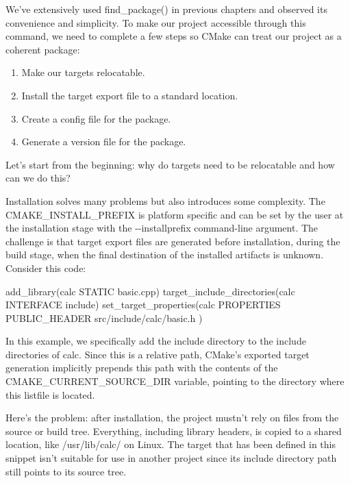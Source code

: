 
We’ve extensively used find\_package() in previous chapters and observed its convenience and simplicity. To make our project accessible through this command, we need to complete a few steps so CMake can treat our project as a coherent package:

\begin{enumerate}
\item
Make our targets relocatable.

\item
Install the target export file to a standard location.

\item
Create a config file for the package.

\item
Generate a version file for the package.
\end{enumerate}

Let’s start from the beginning: why do targets need to be relocatable and how can we do this?


Installation solves many problems but also introduces some complexity. The CMAKE\_INSTALL\_PREFIX is platform specific and can be set by the user at the installation stage with the -{}-installprefix command-line argument. The challenge is that target export files are generated before installation, during the build stage, when the final destination of the installed artifacts is unknown.
Consider this code:


\begin{cmake}
add_library(calc STATIC basic.cpp)
target_include_directories(calc INTERFACE include)
set_target_properties(calc PROPERTIES
    PUBLIC_HEADER src/include/calc/basic.h
)
\end{cmake}

In this example, we specifically add the include directory to the include directories of calc. Since this is a relative path, CMake’s exported target generation implicitly prepends this path with the contents of the CMAKE\_CURRENT\_SOURCE\_DIR variable, pointing to the directory where this listfile is located.

Here’s the problem: after installation, the project mustn’t rely on files from the source or build tree. Everything, including library headers, is copied to a shared location, like /usr/lib/calc/ on Linux. The target that has been defined in this snippet isn’t suitable for use in another project since its include directory path still points to its source tree.

